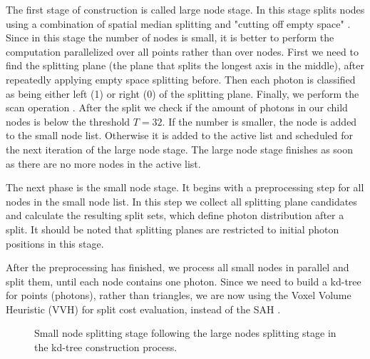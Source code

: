 The first stage of construction is called large node stage. In this stage splits nodes using a combination of spatial median splitting and "cutting off empty space" \cite{Havran2000:PhD}. Since in this stage the number of nodes is small, it is better to perform the computation parallelized over all points rather than over nodes. First we need to find the splitting plane (the plane that splits the longest axis in the middle), after repeatedly applying empty space splitting before. Then each photon is classified as being either left (1) or right (0) of the splitting plane. Finally, we perform the scan operation \cite{Mark2007}. After the split we check if the amount of photons in our child nodes is below the threshold \(T = 32\). If the number is smaller, the node is added to the small node list. Otherwise it is added to the active list and scheduled for the next iteration of the large node stage. The large node stage finishes as soon as there are no more nodes in the active list.

The next phase is the small node stage. It begins with a preprocessing step for all nodes in the small node list. In this step we collect all splitting plane candidates and calculate the resulting split sets, which define photon distribution after a split. It should be noted that splitting planes are restricted to initial photon positions in this stage.

After the preprocessing has finished, we process all small nodes in parallel and split them, until each node contains one photon. Since we need to build a kd-tree for points (photons), rather than triangles, we are now using the Voxel Volume Heuristic (VVH) \cite{wald:04:VVH} for split cost evaluation, instead of the SAH \cite{Havran2000:PhD}.

\begin{figure}[ftp]
    \centering
    \renewcommand{\thefigure}{\thechapter.\arabic{figure}}
    \caption[The Small Nodes splitting stage within kd-tree construction]{Small node splitting stage following the large nodes  splitting stage in the kd-tree construction process.}
    \label{fig:small_node_splitting}
\end{figure}

